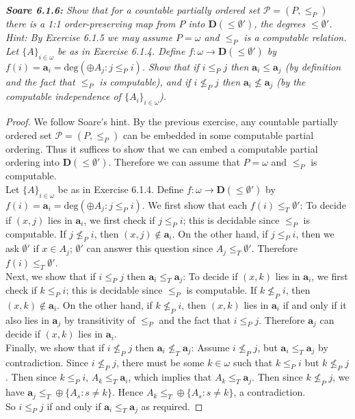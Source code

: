 \documentclass{article}
\begin{document}
\it \textbf{Soare 6.1.6:} Show that for a countable partially ordered set
  $\mathcal{P}=(P,\leq_P)$ there is a 1:1 order-preserving map from $P$
  into $\bm{D}(\leq\emptyset')$, the degrees $\leq\emptyset'$. Hint:
  By Exercise 6.1.5 we may assume $P=\omega$ and $\leq_P$ is a computable
  relation. Let $\{A\}_{i\in\omega}$ be as in Exercise 6.1.4. Define
  $f:\omega\rightarrow \bm{D}(\leq\emptyset')$ by
  $f(i)=\bm{a}_i=\text{deg}(\oplus A_j:j\leq_P i)$. Show that if $i\leq_P
  j$ then $\bm{a}_i\leq\bm{a}_j$ (by definition and the fact that $\leq_P$
  is computable), and if $i\not\leq_P j$ then $\bm{a}_i\not\leq\bm{a}_j$
  (by the computable independence of $\{A_i\}_{i\in\omega}$).

  \begin{proof}
    We follow Soare's hint. By the previous exercise, any countable
    partially ordered set $\mathcal{P}=(P,\leq_P)$ can be embedded in some
    computable partial ordering. Thus it suffices to show that we can embed
    a computable partial ordering into $\bm{D}(\leq\emptyset')$.
    Therefore we can assume that $P=\omega$ and $\leq_P$ is computable. \\

    Let $\{A\}_{i\in\omega}$ be as in Exercise 6.1.4. Define
    $f:\omega\rightarrow \bm{D}(\leq\emptyset')$ by
    $f(i)=\bm{a}_i=\text{deg}(\oplus A_j:j\leq_P i)$. We first show that
    each $f(i)\leq_T\emptyset'$: To decide if $(x,j)$ lies in $\bm{a}_i$,
    we first check if $j\leq_P i$; this is decidable since $\leq_P$ is
    computable. If $j\not\leq_P i$, then $(x,j)\not\in\bm{a}_i$. On the
    other hand, if $j\leq_P i$, then we ask $\emptyset'$ if $x\in A_j$;
    $\emptyset'$ can answer this question since $A_j\leq_T\emptyset'$.
    Therefore $f(i)\leq_T\emptyset'$. \\

    Next, we show that if $i\leq_P j$ then $\bm{a}_i\leq_T\bm{a}_j$: To
    decide if $(x,k)$ lies in $\bm{a}_i$, we first check if $k\leq_P i$;
    this is decidable since $\leq_P$ is computable. If $k\not\leq_P i$,
    then $(x,k)\not\in\bm{a}_i$. On the other hand, if $k\not\leq_P i$,
    then $(x,k)$ lies in $\bm{a}_i$ if and only if it also lies in
    $\bm{a}_j$ by transitivity of $\leq_P$ and the fact that $i\leq_P j$.
    Therefore $\bm{a}_j$ can decide if $(x,k)$ lies in $\bm{a}_i$. \\

    Finally, we show that if $i\not\leq_P j$ then
    $\bm{a}_i\not\leq_T\bm{a}_j$: Assume $i\not\leq_P j$, but
    $\bm{a}_i\leq_T\bm{a}_j$ by contradiction. Since $i\not\leq_P j$, there
    must be some $k\in\omega$ such that $k\leq_P i$ but $k\not\leq_P j$.
    Then since $k\leq_P i$, $A_k\leq_T\bm{a}_i$, which implies that
    $A_k\leq_T\bm{a}_j$. Then since $k\not\leq_P j$, we have $\bm{a}_j\leq_T
    \oplus\{A_s:s\neq k\}$. Hence $A_k\leq_T \oplus\{A_s:s\neq k\}$,
    a contradiction. \\

    So $i\leq_P j$ if and only if $\bm{a}_i\leq_T\bm{a}_j$ as required.
  \end{proof}
\end{document}
